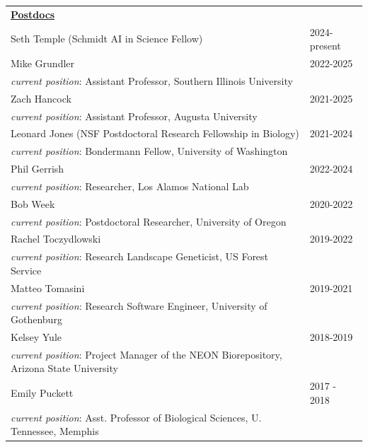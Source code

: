 \documentclass{gbcv}
\begin{document}
\begin{longtable}{>{\everypar{\hangindent1cm}}p{}p{}}
%
\textbf{\underline{Postdocs}}\\
\rule{0pt}{3ex}Seth Temple (Schmidt AI in Science Fellow) & \hfill 2024-present\\
Mike Grundler & \hfill 2022-2025\\
\hspace{0.5cm} \textit{current position}: Assistant Professor, Southern Illinois University\\
Zach Hancock & \hfill 2021-2025\\
\hspace{0.5cm} \textit{current position}: Assistant Professor, Augusta University\\
Leonard Jones (NSF Postdoctoral Research Fellowship in Biology) & \hfill 2021-2024\\
\hspace{0.5cm} \textit{current position}: Bondermann Fellow, University of Washington \\
Phil Gerrish & \hfill 2022-2024\\
\hspace{0.5cm} \textit{current position}: Researcher, Los Alamos National Lab \\
Bob Week & \hfill 2020-2022\\
\hspace{0.5cm} \textit{current position}: Postdoctoral Researcher, University of Oregon \\
Rachel Toczydlowski & \hfill 2019-2022\\
\hspace{0.5cm} \textit{current position}: Research Landscape Geneticist, US Forest Service \\
Matteo Tomasini & \hfill 2019-2021\\
\hspace{0.5cm} \textit{current position}: Research Software Engineer, University of Gothenburg \\
Kelsey Yule & \hfill 2018-2019\\
\hspace{0.5cm} \textit{current position}: Project Manager of the NEON Biorepository, Arizona State University\\
Emily Puckett & \hfill 2017 - 2018\\
\hspace{0.5cm}\textit{current position}: Asst. Professor of Biological Sciences, U. Tennessee, Memphis\\

\end{longtable}
\end{document}
